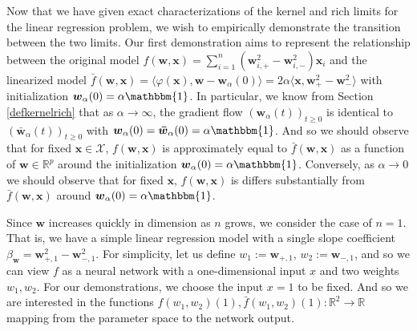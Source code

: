 \documentclass{article}
\begin{document}
Now that we have given exact characterizations of the kernel and rich limits for the linear regression problem, we wish to empirically demonstrate the transition between the two limits. Our first demonstration aims to represent the relationship between the original model $f(\boldsymbol{w}, \boldsymbol{x}) = \sum_{i=1}^n (\boldsymbol{w}_{i,+}^2 - \boldsymbol{w}_{i,-}^2)\boldsymbol{x}_i$ and the linearized model $\bar{f}(\boldsymbol{w}, \boldsymbol{x}) = \langle \varphi(\boldsymbol{x}), \boldsymbol{w} - \boldsymbol{w}_{\alpha}(0) \rangle = 2\alpha \langle \boldsymbol{x} , \boldsymbol{w}_+^2 -  \boldsymbol{w}_-^2\rangle$ with initialization $\boldsymbol{w}_{\alpha}(0) = \alpha \mathbbm{1}$. In particular, we know from Section \ref{defkernelrich} that as $\alpha \rightarrow \infty$, the gradient flow $(\boldsymbol{w}_{\alpha}(t))_{t \geq 0}$ is identical to $(\boldsymbol{\bar{w}}_{\alpha}(t))_{t \geq 0}$ with $\boldsymbol{w}_{\alpha}(0) = \boldsymbol{\bar{w}}_{\alpha}(0) = \alpha \mathbbm{1}$. And so we should observe that for fixed $\boldsymbol{x} \in \mathcal{X}$, $f(\boldsymbol{w}, \boldsymbol{x})$ is approximately equal to $\bar{f}(\boldsymbol{w}, \boldsymbol{x})$ as a function of $\boldsymbol{w} \in \mathbb{R}^p$ around the initialization $\boldsymbol{w}_{\alpha}(0) = \alpha \mathbbm{1}$. Conversely, as $\alpha \rightarrow 0$ we should observe that for fixed $\boldsymbol{x}$, $f(\boldsymbol{w}, \boldsymbol{x})$ is differs substantially from $\bar{f}(\boldsymbol{w}, \boldsymbol{x})$ around $\boldsymbol{w}_{\alpha}(0) = \alpha \mathbbm{1}$.

Since $\boldsymbol{w}$ increases quickly in dimension as $n$ grows, we consider the case of $n =1$. That is, we have a simple linear regression model with a single slope coefficient $\beta_{\boldsymbol{w}} = \boldsymbol{w}_{+, 1}^2 - \boldsymbol{w}_{-, 1}^2$. For simplicity, let us define $w_1 := \boldsymbol{w}_{+, 1}$, $w_2 := \boldsymbol{w}_{-, 1}$, and so we can view $f$ as a neural network with a one-dimensional input $x$ and two weights $w_1, w_2$. For our demonstrations, we choose the input $x = 1$ to be fixed. And so we are interested in the functions $f(w_1, w_2)(1), \bar{f}(w_1, w_2)(1): \mathbb{R}^2 \rightarrow \mathbb{R}$ mapping from the parameter space to the network output.
\end{document}

